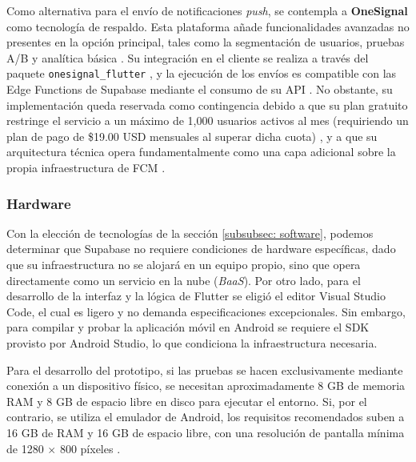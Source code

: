 Como alternativa para el envío de notificaciones \textit{push}, se contempla a \textbf{OneSignal} como tecnología de respaldo. Esta plataforma añade funcionalidades avanzadas no presentes en la opción principal, tales como la segmentación de usuarios, pruebas A/B y analítica básica \cite{onesignal_pricing}. Su integración en el cliente se realiza a través del paquete \texttt{onesignal\_flutter} \cite{onesignal_flutter}, y la ejecución de los envíos es compatible con las Edge Functions de Supabase mediante el consumo de su API \cite{onesignal_flutter}. No obstante, su implementación queda reservada como contingencia debido a que su plan gratuito restringe el servicio a un máximo de 1,000 usuarios activos al mes (requiriendo un plan de pago de \$19.00 USD mensuales al superar dicha cuota) \cite{onesignal_pricing}, y a que su arquitectura técnica opera fundamentalmente como una capa adicional sobre la propia infraestructura de FCM \cite{onesignal_flutter}.


\subsubsection{Hardware}

Con la elección de tecnologías de la sección \ref{subsubsec: software}, podemos determinar que Supabase no requiere condiciones de hardware específicas, dado que su infraestructura no se alojará en un equipo propio, sino que opera directamente como un servicio en la nube (\textit{BaaS}). Por otro lado, para el desarrollo de la interfaz y la lógica de Flutter se eligió el editor Visual Studio Code, el cual es ligero y no demanda especificaciones excepcionales. Sin embargo, para compilar y probar la aplicación móvil en Android se requiere el SDK provisto por Android Studio, lo que condiciona la infraestructura necesaria.

Para el desarrollo del prototipo, si las pruebas se hacen exclusivamente mediante conexión a un dispositivo físico, se necesitan aproximadamente 8 GB de memoria RAM y 8 GB de espacio libre en disco para ejecutar el entorno. Si, por el contrario, se utiliza el emulador de Android, los requisitos recomendados suben a 16 GB de RAM y 16 GB de espacio libre, con una resolución de pantalla mínima de 1280 $\times$ 800 píxeles \cite{androidstudio_install}.

